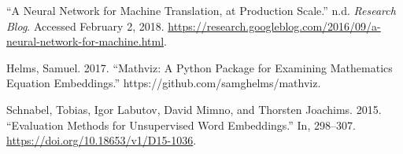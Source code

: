 \documentclass[]{article}
\begin{document}
\hypertarget{refs}{}
\leavevmode\hypertarget{ref-noauthor_neural_nodate}{}%
``A Neural Network for Machine Translation, at Production Scale.'' n.d.
\emph{Research Blog}. Accessed February 2, 2018.
\url{https://research.googleblog.com/2016/09/a-neural-network-for-machine.html}.

\leavevmode\hypertarget{ref-samghelms_mathviz:_2017}{}%
Helms, Samuel. 2017. ``Mathviz: A Python Package for Examining
Mathematics Equation Embeddings.'' https://github.com/samghelms/mathviz.

\leavevmode\hypertarget{ref-schnabel_evaluation_2015}{}%
Schnabel, Tobias, Igor Labutov, David Mimno, and Thorsten Joachims.
2015. ``Evaluation Methods for Unsupervised Word Embeddings.'' In,
298--307. \url{https://doi.org/10.18653/v1/D15-1036}.
\end{document}
